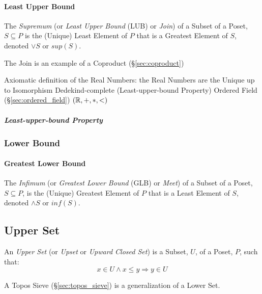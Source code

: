 \paragraph{Least Upper Bound}\label{sec:least_upperbound}\hfill

The \emph{Supremum} (or \emph{Least Upper Bound} (LUB) or \emph{Join})
of a Subset of a Poset, $S \subseteq P$ is the (Unique) Least Element
of $P$ that is a Greatest Element of $S$, denoted $\vee S$ or $sup
(S)$.

The Join is an example of a Coproduct (\S\ref{sec:coproduct})

Axiomatic definition of the Real Numbers: the Real Numbers are the Unique up to
Isomorphism Dedekind-complete (Least-upper-bound Property) Ordered Field
(\S\ref{sec:ordered_field}) $(\mathbb{R}, +, *, <)$



\subparagraph{Least-upper-bound Property}
\label{sec:leastupperbound_property}\hfill



\subsubsection{Lower Bound}\label{sec:lower_bound}

\paragraph{Greatest Lower Bound}\label{sec:greatest_lowerbound}\hfill

The \emph{Infimum} (or \emph{Greatest Lower Bound} (GLB) or
\emph{Meet}) of a Subset of a Poset, $S \subseteq P$, is the (Unique)
Greatest Element of $P$ that is a Least Element of $S$, denoted
$\wedge S$ or $inf (S)$.



\subsection{Upper Set}\label{sec:upper_set}

An \emph{Upper Set} (or \emph{Upset} or \emph{Upward Closed Set}) is a
Subset, $U$, of a Poset, $P$, such that:
\[
  x \in U \wedge x \leq y \Rightarrow y \in U
\]

A Topos Sieve (\S\ref{sec:topos_sieve}) is a generalization of a Lower
Set.

